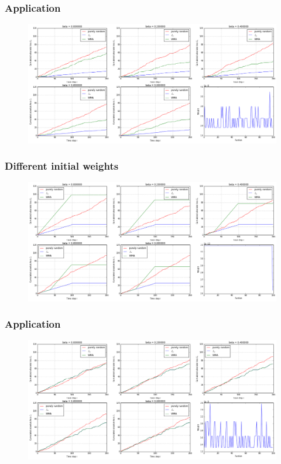 \documentclass{beamer}
\begin{document}
\begin{frame}
	\frametitle{Application }
	\begin{figure}
		\includegraphics[scale=0.25]{exo6.png}
	\end{figure}
\end{frame}
\begin{frame}
	\frametitle{Different initial weights }
	\begin{figure}
		\includegraphics[scale=0.25]{exo6_ordered.png}
	\end{figure}
\end{frame}
\begin{frame}
	\frametitle{Application }
	\begin{figure}
		\includegraphics[scale=0.25]{exo6_01loss.png}
	\end{figure}
\end{frame}
\end{document}
